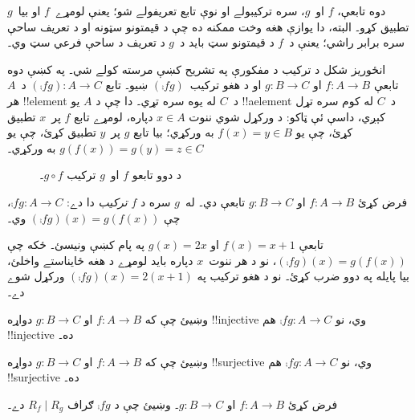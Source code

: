 \documentclass[../../../include/open-logic-section]{subfiles}
\begin{document}

\begin{explain}
 دوه تابعې، $f$ او~$g$، سره
ترکيبولے او نوې تابع تعريفولے شو؛ يعنې لومړے~$f$ او بيا~$g$
تطبيق کړو۔ البته، دا يوازې هغه وخت ممکنه ده چې د قيمتونو سټونه
او د تعريف ساحې سره برابر راشي؛ يعنې د~$f$ د قيمتونو سټ بايد د~$g$
د تعريف د ساحې فرعي سټ وي۔ 

انځوريز شکل د ترکيب د مفکورې په تشريح کښې مرسته کولے شي۔ په
 کښې دوه تابعې $f \colon A \to B$ او
$g \colon B \to C$ او د هغو ترکيب~$(\comp{f}{g})$ ښيو۔ تابع
$(\comp{f}{g}) \colon A \to C$ د~$A$ هر !!{element} د~$C$ له يوه
 سره تړي۔ دا چې د $A$ يو !!a{element}
د~$C$ له کوم  سره تړل کېږي، داسې ئې ټاکو:
د ورکړل شوي ننوت $x \in A$ دپاره، لومړے تابع $f$ پر~$x$ تطبيق
کړئ، چې يو $f(x) = y \in B$ به ورکړي؛ بيا تابع $g$ پر~$y$ تطبيق
کړئ، چې يو $g(f(x)) = g(y) = z \in C$ به ورکړي۔
\begin{figure}
  \caption{د دوو تابعو $f$ او~$g$ ترکيب $g \circ f$۔}
\end{figure}
\end{explain}

\begin{defn}[ترکيب]
فرض کړئ $f\colon A \to B$ او $g\colon B \to C$ تابعې دي۔
له~$g$ سره د $f$ \emph{ترکيب} دا دے: $\comp{f}{g} \colon A \to C$،
چې $(\comp{f}{g})(x) = g(f(x))$ وي۔
\end{defn}

\begin{ex}
تابعې $f(x) = x + 1$ او $g(x) = 2x$ په پام کښې ونيسئ۔ ځکه چې
$(\comp{f}{g})(x) = g(f(x))$، نو د هر ننوت~$x$ دپاره بايد لومړے
د هغه ځايناستے واخلئ، بيا پايله په دوو ضرب کړئ۔ نو د هغو ترکيب
په $(\comp{f}{g})(x) = 2(x+1)$ ورکړل شوے دے۔
\end{ex}

\begin{prob}
وښيئ چې که $f \colon A \to B$ او $g \colon B \to C$ دواړه
!!{injective} وي، نو $\comp{f}{g}\colon A \to C$ هم !!{injective} ده۔
\end{prob}

\begin{prob}
وښيئ چې که $f \colon A \to B$ او $g \colon B \to C$ دواړه
!!{surjective} وي، نو $\comp{f}{g}\colon A \to C$ هم !!{surjective} ده۔
\end{prob}

\begin{prob}
فرض کړئ $f \colon A \to B$ او $g \colon B \to C$۔ وښيئ چې د
$\comp{f}{g}$ ګراف $R_f \mid R_g$ دے۔
\end{prob}
\end{document}
